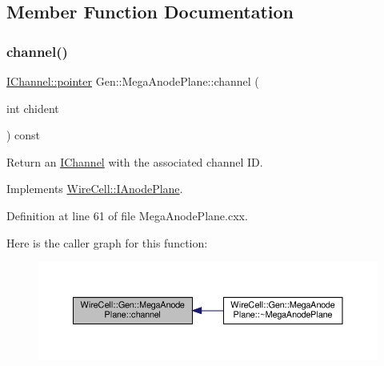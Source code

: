 \subsection{Member Function Documentation}
\mbox{\label{class_wire_cell_1_1_gen_1_1_mega_anode_plane_a3cc2a292c89472524f21379c0eff1111}} 
\subsubsection{\texorpdfstring{channel()}{channel()}}
{\footnotesize\ttfamily \hyperlink{class_wire_cell_1_1_i_data_aff870b3ae8333cf9265941eef62498bc}{I\+Channel\+::pointer} Gen\+::\+Mega\+Anode\+Plane\+::channel (\begin{DoxyParamCaption}\item[{int}]{chident }\end{DoxyParamCaption}) const\hspace{0.3cm}{\ttfamily [virtual]}}



Return an \hyperlink{class_wire_cell_1_1_i_channel}{I\+Channel} with the associated channel ID. 



Implements \hyperlink{class_wire_cell_1_1_i_anode_plane_ab9cab29e958c7cc4aa7dd9cb600c33cd}{Wire\+Cell\+::\+I\+Anode\+Plane}.



Definition at line 61 of file Mega\+Anode\+Plane.\+cxx.

Here is the caller graph for this function\+:
\nopagebreak
\begin{figure}[H]
\begin{center}
\leavevmode
\includegraphics[width=350pt]{class_wire_cell_1_1_gen_1_1_mega_anode_plane_a3cc2a292c89472524f21379c0eff1111_icgraph}
\end{center}
\end{figure}
\mbox{\label{class_wire_cell_1_1_gen_1_1_mega_anode_plane_a1106718600e8a867efd62a7c9dedafd2}} 
